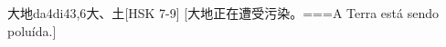\begin{EntryWithPhonetic}{大地}{da4di4}{3,6}{⼤、⼟}[HSK 7-9]
  [大地正在遭受污染。===A Terra está sendo poluída.]
\end{EntryWithPhonetic}
